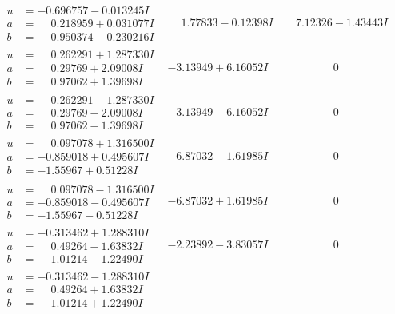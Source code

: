 \documentclass[1p]{elsarticle_modified}
\theoremstyle{definition}
\begin{document}
$$\begin{array}{c|c|c}
\begin{aligned}
u &= -0.696757 - 0.013245 I \\
a &= \phantom{-}0.218959 + 0.031077 I \\
b &= \phantom{-}0.950374 - 0.230216 I\end{aligned}
 & \phantom{-}1.77833 - 0.12398 I & \phantom{-}7.12326 - 1.43443 I \\ \hline\begin{aligned}
u &= \phantom{-}0.262291 + 1.287330 I \\
a &= \phantom{-}0.29769 + 2.09008 I \\
b &= \phantom{-}0.97062 + 1.39698 I\end{aligned}
 & -3.13949 + 6.16052 I & \phantom{-0.000000 } 0 \\ \hline\begin{aligned}
u &= \phantom{-}0.262291 - 1.287330 I \\
a &= \phantom{-}0.29769 - 2.09008 I \\
b &= \phantom{-}0.97062 - 1.39698 I\end{aligned}
 & -3.13949 - 6.16052 I & \phantom{-0.000000 } 0 \\ \hline\begin{aligned}
u &= \phantom{-}0.097078 + 1.316500 I \\
a &= -0.859018 + 0.495607 I \\
b &= -1.55967 + 0.51228 I\end{aligned}
 & -6.87032 - 1.61985 I & \phantom{-0.000000 } 0 \\ \hline\begin{aligned}
u &= \phantom{-}0.097078 - 1.316500 I \\
a &= -0.859018 - 0.495607 I \\
b &= -1.55967 - 0.51228 I\end{aligned}
 & -6.87032 + 1.61985 I & \phantom{-0.000000 } 0 \\ \hline\begin{aligned}
u &= -0.313462 + 1.288310 I \\
a &= \phantom{-}0.49264 - 1.63832 I \\
b &= \phantom{-}1.01214 - 1.22490 I\end{aligned}
 & -2.23892 - 3.83057 I & \phantom{-0.000000 } 0 \\ \hline\begin{aligned}
u &= -0.313462 - 1.288310 I \\
a &= \phantom{-}0.49264 + 1.63832 I \\
b &= \phantom{-}1.01214 + 1.22490 I\end{aligned}

\end{array}$$
\end{document}

